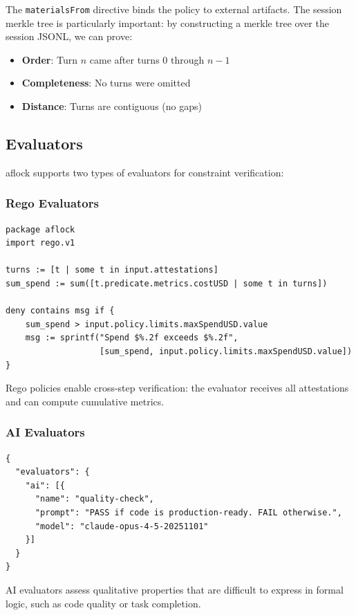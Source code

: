 \documentclass[11pt,a4paper]{article}
\begin{document}
The \texttt{materialsFrom} directive binds the policy to external artifacts. The session merkle tree is particularly important: by constructing a merkle tree over the session JSONL, we can prove:
\begin{itemize}[noitemsep]
    \item \textbf{Order}: Turn $n$ came after turns $0$ through $n-1$
    \item \textbf{Completeness}: No turns were omitted
    \item \textbf{Distance}: Turns are contiguous (no gaps)
\end{itemize}

\subsection{Evaluators}

aflock supports two types of evaluators for constraint verification:

\subsubsection{Rego Evaluators}

\begin{lstlisting}[style=rego]
package aflock
import rego.v1

turns := [t | some t in input.attestations]
sum_spend := sum([t.predicate.metrics.costUSD | some t in turns])

deny contains msg if {
    sum_spend > input.policy.limits.maxSpendUSD.value
    msg := sprintf("Spend $%.2f exceeds $%.2f",
                   [sum_spend, input.policy.limits.maxSpendUSD.value])
}
\end{lstlisting}

Rego policies enable cross-step verification: the evaluator receives all attestations and can compute cumulative metrics.

\subsubsection{AI Evaluators}

\begin{lstlisting}[style=json]
{
  "evaluators": {
    "ai": [{
      "name": "quality-check",
      "prompt": "PASS if code is production-ready. FAIL otherwise.",
      "model": "claude-opus-4-5-20251101"
    }]
  }
}
\end{lstlisting}

AI evaluators assess qualitative properties that are difficult to express in formal logic, such as code quality or task completion.
\end{document}
